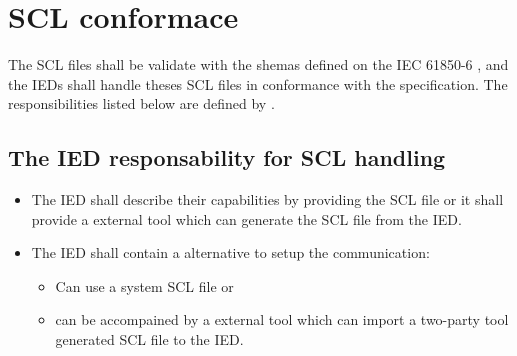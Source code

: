 \section{SCL conformace}

The SCL files shall be validate with the shemas defined 
on  the 
IEC 61850-6 \cite{IEC61850-6:2004} , and 
the IEDs shall handle theses SCL files 
in conformance with the specification.
The responsibilities listed below are 
defined by \cite[clause 5]{IEC61850-6:2004}. %

	\subsection{The IED responsability for SCL handling}
	\begin{itemize}
		\item 	The IED shall describe their capabilities by providing 
	 			the SCL file or it shall provide a external tool which 
	 			can generate the SCL file from the IED. 
	 	\item	The IED shall contain a alternative to setup the 
	 			communication: 
	 			
	 			\begin{itemize} 
                   \item Can use a system SCL file or 
                   \item can be accompained by a external 
                   		 tool which can import 
	 					 a two-party tool generated SCL file to the IED.
	 			 \end{itemize}
    \end{itemize}
 	 
